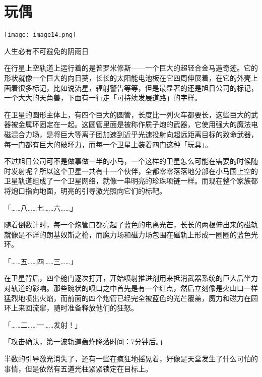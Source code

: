 \chapter{玩偶}

\texttt{[image: image14.png]}

\begin{intro}
    人生必有不可避免的阴雨日
\end{intro}


在行星上空轨道上运行着的是普罗米修斯——一个巨大的超轻合金马造奇迹。它的形状就像一个巨大的向日葵，长长的太阳能电池板在它四周伸展着，在它的外壳上画着很多标记，比如说流星，辐射警告等等，但是最显著的还是旭日公司的标记，一个大大的天角兽，下面有一行走「可持续发展道路」的字样。

在卫星的圆形主体上，有四个巨大的圆管，长度比一列火车都要长，这些巨大的武器被金属环固定在一起。这圆管里面是被称作质子炮的武器，它使用强大的魔法电磁混合力场，是将巨大等离子团加速到近乎光速投射向超远距离目标的致命武器，每一门都有巨大的破坏力，而每一个卫星上装着四门这种「玩具」。

不过旭日公司可不是做事做一半的小马，一个这样的卫星怎么可能在需要的时候随时发射呢？所以这个卫星一共有十一个伙伴，全都零零落落地分部在小马国上空的卫星轨道组成了一个卫星网络，就像一串明亮的珍珠项链一样。而现在整个家族都将炮口指向地面，明亮的引导激光照向它们的标靶。

「{\mt ……八……七……六……}」

随着倒数计时，每一个炮管口都亮起了蓝色的电离光芒，长长的两根伸出来的磁轨就像是不详的朗基奴斯之枪，而魔力场和磁力场包围在磁轨上形成一圈圈的蓝色光环。

「{\mt ……五……四……三……}」

在卫星背后，四个舱门逐次打开，开始喷射推进剂用来抵消武器系统的巨大后坐力对轨道的影响。那些碗状的喷口之中首先是有一个红点，然后立刻像是火山口一样猛烈地喷出火焰，而前面的四个炮管已经完全被蓝色的光芒覆盖，魔力和磁力在圆环上来回流窜，随时准备释放他们的狂怒。

「{\mt ……二……一……发射！}」

\horizonline


「{\mt 攻击确认，第一波轨道轰炸降落时间：7分钟后。}」

半数的引导激光消失了，还有一些在疯狂地摇晃着，好像是天堂发生了什么可怕的事情，但是依然有五道光柱紧紧锁定在目标上。

